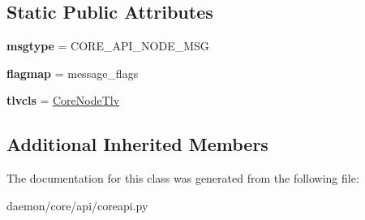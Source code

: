 \subsection*{Static Public Attributes}
\begin{DoxyCompactItemize}
\item 
\hypertarget{classcore_1_1api_1_1coreapi_1_1_core_node_message_a5583d080247f3e156731833116660ec6}{{\bfseries msgtype} = C\+O\+R\+E\+\_\+\+A\+P\+I\+\_\+\+N\+O\+D\+E\+\_\+\+M\+S\+G}\label{classcore_1_1api_1_1coreapi_1_1_core_node_message_a5583d080247f3e156731833116660ec6}

\item 
\hypertarget{classcore_1_1api_1_1coreapi_1_1_core_node_message_a1948590da6da8b47d9ca80adf0522b00}{{\bfseries flagmap} = message\+\_\+flags}\label{classcore_1_1api_1_1coreapi_1_1_core_node_message_a1948590da6da8b47d9ca80adf0522b00}

\item 
\hypertarget{classcore_1_1api_1_1coreapi_1_1_core_node_message_a876cfe9d24b04fb17acbd8d9c64b273e}{{\bfseries tlvcls} = \hyperlink{classcore_1_1api_1_1coreapi_1_1_core_node_tlv}{Core\+Node\+Tlv}}\label{classcore_1_1api_1_1coreapi_1_1_core_node_message_a876cfe9d24b04fb17acbd8d9c64b273e}

\end{DoxyCompactItemize}
\subsection*{Additional Inherited Members}


The documentation for this class was generated from the following file\+:\begin{DoxyCompactItemize}
\item 
daemon/core/api/coreapi.\+py\end{DoxyCompactItemize}
